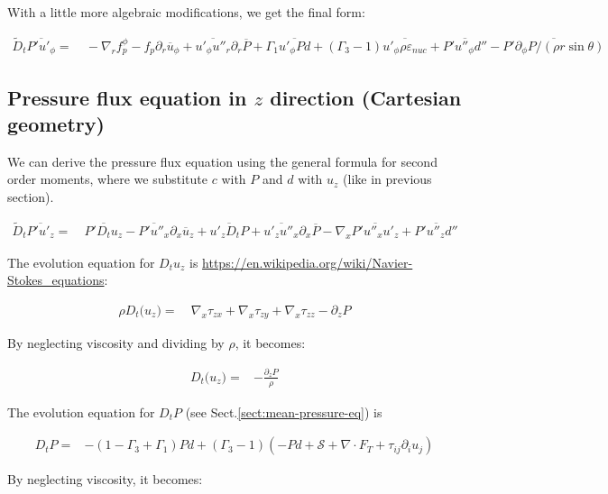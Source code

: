 \documentclass[10pt,paper=a4]{report}
\newcommand{\eht}{\overline}
\newcommand{\fht}{\widetilde}
\begin{document}
\noindent With a little more algebraic modifications, we get the final form:

\begin{align}
  \fht{D}_t \eht{P'u'_\phi} = & \ -\nabla_r f_p^\phi - f_p\partial_r \eht{u}_\phi + \eht{u'_\phi u''_r}\partial_r \eht{P} +\Gamma_1 \eht{u'_\phi P d} + (\Gamma_3 -1)\eht{u'_\phi \rho \varepsilon_{nuc}} + \eht{P'u''_\phi d''} - \eht{P'\partial_{\phi} P / (\rho r \sin{\theta})}  
\end{align}

\subsection{Pressure flux equation in $z$ direction (Cartesian geometry)}

We can derive the pressure flux equation using the general formula for second order moments, where we substitute $c$ with $P$ and $d$ with $u_z$ (like in previous section).

\begin{align}
  \fht{D}_t \eht{P'u'_z} = & \ \eht{P'D_t u_z} - \eht{P'u''_x} \partial_x \eht{u}_z + \eht{u'_z D_t P} + \eht{u'_z u''_x} \partial_x \eht{P} - \nabla_x \eht{P' u''_x u'_z} + \eht{P'u''_z d''} 
\end{align}

\noindent
The evolution equation for $D_t u_z$ is \href{https://en.wikipedia.org/wiki/Navier-Stokes_equations}{https://en.wikipedia.org/wiki/Navier-Stokes\_equations}: 

\begin{align}
\rho D_{t} \big(u_{z}\big) = & \ \nabla_x \tau_{zx} + \nabla_x \tau_{zy} + \nabla_x \tau_{zz} - \partial_{z} P 
\end{align}

\noindent
By neglecting viscosity and dividing by $\rho$, it becomes:

\begin{align}
D_{t} \big(u_{z}\big) = & -\frac{\partial_{z} P}{\rho}
\end{align}

\noindent
The evolution equation for $D_t P$ (see Sect.\ref{sect:mean-pressure-eq}) is 

\begin{align}
D_t P = & -(1-\Gamma_3+\Gamma_1)Pd + (\Gamma_3 -1)(-Pd + {\mathcal S} + \nabla \cdot F_T + \tau_{ij}\partial_i u_j)
\end{align}

\noindent
By neglecting viscosity, it becomes:
\end{document}
